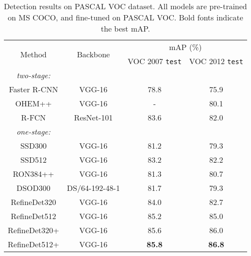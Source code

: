 \documentclass[10pt,twocolumn,letterpaper]{article}
\begin{document}
\begin{table}
\centering
\caption{Detection results on PASCAL VOC dataset. All models are pre-trained on MS COCO, and fine-tuned on PASCAL VOC. Bold fonts indicate the best mAP.}
\vspace{-2mm}
\footnotesize \setlength{\tabcolsep}{1.5pt}
\begin{tabular}{c|c|c|c}
\toprule[1.5pt]
\multirow{2}{*}{Method}   &\multirow{2}{*}{Backbone} &\multicolumn{2}{c}{mAP (\%)} \\
\cline{3-4}
 & & VOC 2007 {\tt test} & VOC 2012 {\tt test}\\
\hline
\textit{two-stage:} & & &\\
Faster R-CNN\cite{DBLP:journals/pami/RenHG017}  &VGG-16 &78.8 &75.9   \\
OHEM++\cite{DBLP:conf/cvpr/ShrivastavaGG16}     &VGG-16 &- &80.1 \\
R-FCN\cite{DBLP:conf/nips/DaiLHS16}             &ResNet-101 &83.6 &82.0\\
\hline
\hline
\textit{one-stage:} & & &\\
SSD300\cite{DBLP:conf/eccv/LiuAESRFB16}         &VGG-16         &81.2 &79.3 \\
SSD512\cite{DBLP:conf/eccv/LiuAESRFB16}         &VGG-16         &83.2 &82.2 \\
RON384++\cite{DBLP:conf/cvpr/KongSYLLC17}       &VGG-16         &81.3 &80.7 \\
DSOD300\cite{DBLP:conf/iccv/abs-1708-01241}     &DS/64-192-48-1 &81.7 &79.3 \\
\hline
RefineDet320   &VGG-16        &84.0      &82.7 \\
RefineDet512   &VGG-16        &85.2      &85.0 \\
RefineDet320+  &VGG-16        &85.6      &86.0 \\
RefineDet512+  &VGG-16        &{\bf 85.8}      &{\bf 86.8}  \\
\bottomrule[1.5pt]
\end{tabular}
\label{tab:coco-to-voc}
\vspace{-2mm}
\end{table}
\end{document}
